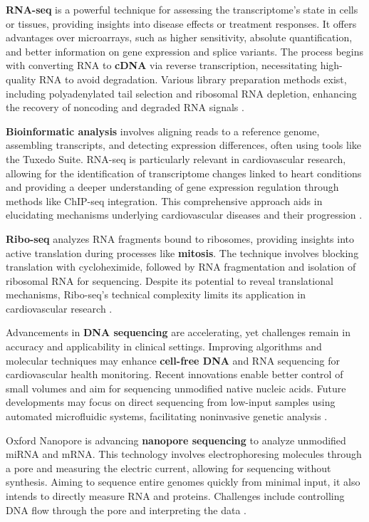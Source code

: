 \textbf{RNA-seq} is a powerful technique for assessing the transcriptome's state in cells or tissues, providing insights into disease effects or treatment responses. It offers advantages over microarrays, such as higher sensitivity, absolute quantification, and better information on gene expression and splice variants. The process begins with converting RNA to \textbf{cDNA} via reverse transcription, necessitating high-quality RNA to avoid degradation. Various library preparation methods exist, including polyadenylated tail selection and ribosomal RNA depletion, enhancing the recovery of noncoding and degraded RNA signals \cite*{L5-HighThroughput}. 

\textbf{Bioinformatic analysis} involves aligning reads to a reference genome, assembling transcripts, and detecting expression differences, often using tools like the Tuxedo Suite. RNA-seq is particularly relevant in cardiovascular research, allowing for the identification of transcriptome changes linked to heart conditions and providing a deeper understanding of gene expression regulation through methods like ChIP-seq integration. This comprehensive approach aids in elucidating mechanisms underlying cardiovascular diseases and their progression \cite*{L5-HighThroughput}.

\textbf{Ribo-seq} analyzes RNA fragments bound to ribosomes, providing insights into active translation during processes like \textbf{mitosis}. The technique involves blocking translation with cycloheximide, followed by RNA fragmentation and isolation of ribosomal RNA for sequencing. Despite its potential to reveal translational mechanisms, Ribo-seq's technical complexity limits its application in cardiovascular research \cite*{L5-HighThroughput}.

Advancements in \textbf{DNA sequencing} are accelerating, yet challenges remain in accuracy and applicability in clinical settings. Improving algorithms and molecular techniques may enhance \textbf{cell-free DNA} and RNA sequencing for cardiovascular health monitoring. Recent innovations enable better control of small volumes and aim for sequencing unmodified native nucleic acids. Future developments may focus on direct sequencing from low-input samples using automated microfluidic systems, facilitating noninvasive genetic analysis \cite*{L5-HighThroughput}.

Oxford Nanopore is advancing \textbf{nanopore sequencing} to analyze unmodified miRNA and mRNA. This technology involves electrophoresing molecules through a pore and measuring the electric current, allowing for sequencing without synthesis. Aiming to sequence entire genomes quickly from minimal input, it also intends to directly measure RNA and proteins. Challenges include controlling DNA flow through the pore and interpreting the data \cite*{L5-HighThroughput}.

